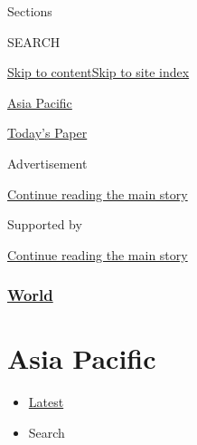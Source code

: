 Sections

SEARCH

\protect\hyperlink{site-content}{Skip to
content}\protect\hyperlink{site-index}{Skip to site index}

\href{https://www.nytimes.com/section/world/asia}{Asia Pacific}

\href{https://myaccount.nytimes.com/auth/login?response_type=cookie\&client_id=vi}{}

\href{https://www.nytimes.com/section/todayspaper}{Today's Paper}

Advertisement

\protect\hyperlink{after-top}{Continue reading the main story}

Supported by

\protect\hyperlink{after-sponsor}{Continue reading the main story}

\hypertarget{world}{%
\subsubsection{\texorpdfstring{\href{/section/world}{World}}{World}}\label{world}}

\hypertarget{asia-pacific}{%
\section{Asia Pacific}\label{asia-pacific}}

\begin{itemize}
\tightlist
\item
  \protect\hyperlink{stream-panel}{Latest}
\item
  Search
\end{itemize}

